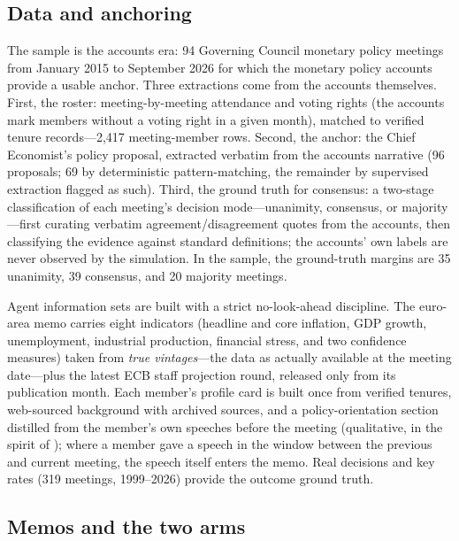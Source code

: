 \documentclass[11pt,a4paper]{article}
\begin{document}
\subsection{Data and anchoring}\label{sec:data}

The sample is the accounts era: 94 Governing Council monetary policy meetings from January 2015 to September 2026 for which the monetary policy accounts provide a usable anchor. Three extractions come from the accounts themselves. First, the roster: meeting-by-meeting attendance and voting rights (the accounts mark members without a voting right in a given month), matched to verified tenure records---2,417 meeting-member rows. Second, the anchor: the Chief Economist's policy proposal, extracted verbatim from the accounts narrative (96 proposals; 69 by deterministic pattern-matching, the remainder by supervised extraction flagged as such). Third, the ground truth for consensus: a two-stage classification of each meeting's decision mode---unanimity, consensus, or majority---first curating verbatim agreement/disagreement quotes from the accounts, then classifying the evidence against standard definitions; the accounts' own labels are never observed by the simulation. In the sample, the ground-truth margins are 35 unanimity, 39 consensus, and 20 majority meetings.

Agent information sets are built with a strict no-look-ahead discipline. The euro-area memo carries eight indicators (headline and core inflation, GDP growth, unemployment, industrial production, financial stress, and two confidence measures) taken from \emph{true vintages}---the data as actually available at the meeting date---plus the latest ECB staff projection round, released only from its publication month. Each member's profile card is built once from verified tenures, web-sourced background with archived sources, and a policy-orientation section distilled from the member's own speeches before the meeting (qualitative, in the spirit of \textcite{hansen2024chatgpt}); where a member gave a speech in the window between the previous and current meeting, the speech itself enters the memo. Real decisions and key rates (319 meetings, 1999--2026) provide the outcome ground truth.

\subsection{Memos and the two arms}\label{sec:memos}
\end{document}
